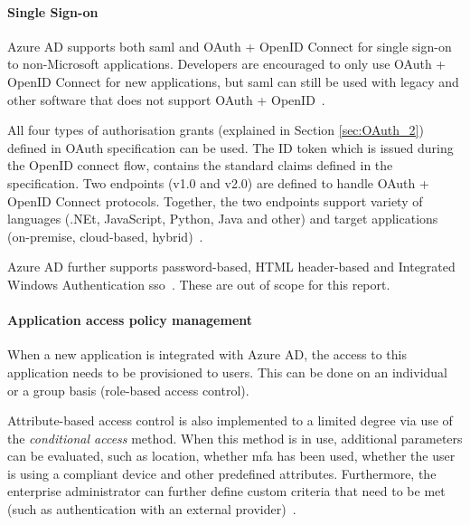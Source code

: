 
\paragraph{Single Sign-on} Azure AD supports both \acrshort{saml} and OAuth + OpenID Connect for single sign-on to non-Microsoft applications. Developers are encouraged to only use OAuth + OpenID Connect for new applications, but \acrshort{saml} can still be used with legacy and other software that does not support OAuth + OpenID~\cite{barbkess2019SingleDirectory}. 

All four types of authorisation grants (explained in Section \ref{sec:OAuth_2}) defined in OAuth specification can be used. The ID token which is issued during the OpenID connect flow, contains the standard claims defined in the specification. Two endpoints (v1.0 and v2.0) are defined to handle OAuth + OpenID Connect protocols. Together, the two endpoints support variety of languages (.NEt, JavaScript, Python, Java and other) and target applications (on-premise, cloud-based, hybrid)~\cite{deGuzman2018AboutPlatform}.

Azure AD further supports password-based, HTML header-based  and Integrated Windows Authentication \acrlong{sso}~\cite{barbkess2019SingleDirectory}. These are out of scope for this report.

\paragraph{Application access policy management} When a new application is integrated with Azure AD, the access to this application needs to be provisioned to users. This can be done on an individual or a group basis (role-based access control). 

Attribute-based access control is also implemented to a limited degree via use of the \textit{conditional access} method. When this method is in use, additional parameters can be evaluated, such as location, whether \acrshort{mfa} has been used, whether the user is using a compliant device and other predefined attributes. Furthermore, the enterprise administrator can further define custom criteria that need to be met (such as authentication with an external provider)~\cite{Vilcinskas2019WhatAccess}.